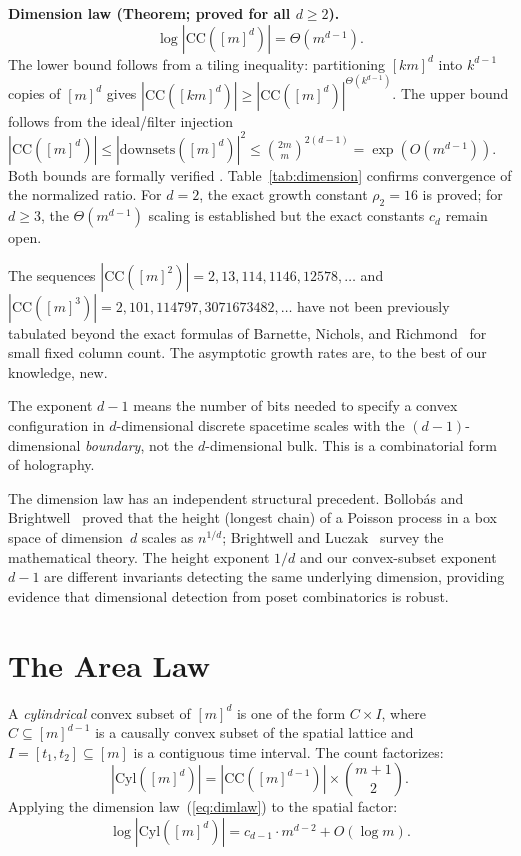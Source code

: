 \documentclass[aps,prl,twocolumn,superscriptaddress]{revtex4-2}
\begin{document}
\textbf{Dimension law (Theorem; proved for all $d \geq 2$).}
\begin{equation}
\label{eq:dimlaw}
\log|\mathrm{CC}([m]^d)| = \Theta(m^{d-1}).
\end{equation}
The lower bound follows from a tiling inequality: partitioning
$[km]^d$ into $k^{d-1}$ copies of $[m]^d$ gives
$|\mathrm{CC}([km]^d)| \geq |\mathrm{CC}([m]^d)|^{\Theta(k^{d-1})}$.
The upper bound follows from the ideal/filter injection
$|\mathrm{CC}([m]^d)| \leq |\mathrm{downsets}([m]^d)|^2 \leq
\binom{2m}{m}^{2(d-1)} = \exp(O(m^{d-1}))$. Both bounds are formally
verified \cite{DiFiorePaper2,leanrepo}. Table~\ref{tab:dimension}
confirms convergence of the normalized ratio. For $d=2$, the exact
growth constant $\rho_2 = 16$ is proved; for $d \geq 3$, the
$\Theta(m^{d-1})$ scaling is established but the exact constants
$c_d$ remain open.

The sequences $|\mathrm{CC}([m]^2)| = 2, 13, 114, 1146, 12578, \ldots$
and $|\mathrm{CC}([m]^3)| = 2, 101, 114797, 3071673482, \ldots$ have
not been previously tabulated beyond the exact formulas of
Barnette, Nichols, and Richmond~\cite{BNR2019} for small fixed column
count. The asymptotic growth rates
are, to the best of our knowledge, new.

The exponent $d-1$ means the number of bits needed to specify a convex
configuration in $d$-dimensional discrete spacetime scales with the
$(d{-}1)$-dimensional \emph{boundary}, not the $d$-dimensional bulk.
This is a combinatorial form of holography.

The dimension law has an independent structural precedent.
Bollob\'as and Brightwell~\cite{BollobasBrightwell1991} proved that the
height (longest chain) of a Poisson process in a box space of
dimension~$d$ scales as $n^{1/d}$; Brightwell and
Luczak~\cite{BrightwellLuczak2015} survey the mathematical theory.
The height exponent $1/d$ and our convex-subset exponent $d-1$ are
different invariants detecting the same underlying dimension, providing
evidence that dimensional detection from poset combinatorics is robust.

\section{The Area Law}

A \emph{cylindrical} convex subset of $[m]^d$ is one of the form
$C \times I$, where $C \subseteq [m]^{d-1}$ is a causally convex
subset of the spatial lattice and $I = [t_1, t_2] \subseteq [m]$ is a
contiguous time interval. The count factorizes:
\begin{equation}
\label{eq:cyl}
|\mathrm{Cyl}([m]^d)| = |\mathrm{CC}([m]^{d-1})| \times
\binom{m+1}{2}.
\end{equation}
Applying the dimension law~(\ref{eq:dimlaw}) to the spatial factor:
\begin{equation}
\label{eq:arealaw}
\log|\mathrm{Cyl}([m]^d)| = c_{d-1} \cdot m^{d-2} + O(\log m).
\end{equation}
\end{document}
